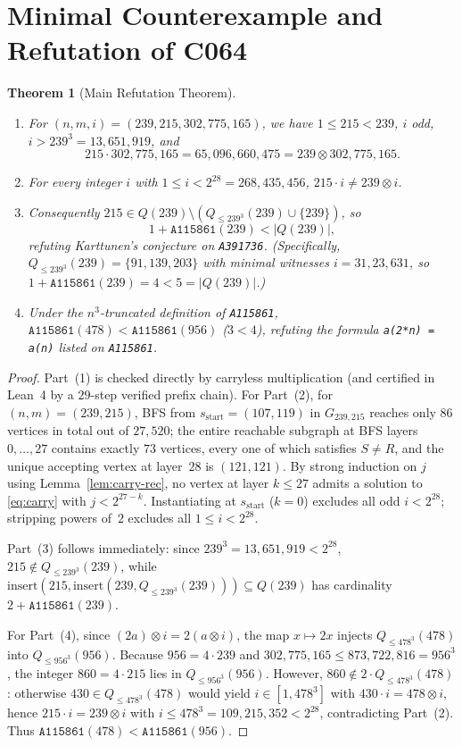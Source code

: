 \documentclass[11pt]{article}
\newtheorem{theorem}{Theorem}[section]
\theoremstyle{definition}
\newcommand{\seq}[1]{\texttt{#1}}
\newcommand{\clmul}{\otimes}
\begin{document}
\section{Minimal Counterexample and Refutation of C064}

\begin{theorem}[Main Refutation Theorem]
\label{thm:main}
\leavevmode
\begin{enumerate}
\item For $(n, m, i) = (239, 215, 302{,}775{,}165)$, we have $1 \le 215 < 239$, $i$ odd, $i > 239^3 = 13{,}651{,}919$, and
\[
215 \cdot 302{,}775{,}165 = 65{,}096{,}660{,}475 = 239 \clmul 302{,}775{,}165.
\]
\item For every integer $i$ with $1 \le i < 2^{28} = 268{,}435{,}456$, $215 \cdot i \neq 239 \clmul i$.
\item Consequently $215 \in Q(239) \setminus (Q_{\le 239^3}(239) \cup \{239\})$, so
\[
1 + \seq{A115861}(239) < |Q(239)|,
\]
refuting Karttunen's conjecture on \seq{A391736}. (Specifically, $Q_{\le 239^3}(239) = \{91, 139, 203\}$ with minimal witnesses $i = 31, 23, 631$, so $1 + \seq{A115861}(239) = 4 < 5 = |Q(239)|$.)
\item Under the $n^3$-truncated definition of \seq{A115861}, $\seq{A115861}(478) < \seq{A115861}(956)$ ($3 < 4$), refuting the formula \texttt{a(2*n) = a(n)} listed on \seq{A115861}.
\end{enumerate}
\end{theorem}

\begin{proof}
Part~(1) is checked directly by carryless multiplication (and certified in Lean~4 by a $29$-step verified prefix chain). For Part~(2), for $(n, m) = (239, 215)$, BFS from $s_{\mathrm{start}} = (107, 119)$ in $G_{239, 215}$ reaches only $86$ vertices in total out of $27{,}520$; the entire reachable subgraph at BFS layers $0, \dots, 27$ contains exactly $73$ vertices, every one of which satisfies $S \neq R$, and the unique accepting vertex at layer~$28$ is $(121, 121)$. By strong induction on $j$ using Lemma~\ref{lem:carry-rec}, no vertex at layer $k \le 27$ admits a solution to \eqref{eq:carry} with $j < 2^{27 - k}$. Instantiating at $s_{\mathrm{start}}$ ($k = 0$) excludes all odd $i < 2^{28}$; stripping powers of~$2$ excludes all $1 \le i < 2^{28}$.

Part~(3) follows immediately: since $239^3 = 13{,}651{,}919 < 2^{28}$, $215 \notin Q_{\le 239^3}(239)$, while $\mathrm{insert}(215, \mathrm{insert}(239, Q_{\le 239^3}(239))) \subseteq Q(239)$ has cardinality $2 + \seq{A115861}(239)$.

For Part~(4), since $(2a) \clmul i = 2(a \clmul i)$, the map $x \mapsto 2x$ injects $Q_{\le 478^3}(478)$ into $Q_{\le 956^3}(956)$. Because $956 = 4 \cdot 239$ and $302{,}775{,}165 \le 873{,}722{,}816 = 956^3$, the integer $860 = 4 \cdot 215$ lies in $Q_{\le 956^3}(956)$. However, $860 \notin 2 \cdot Q_{\le 478^3}(478)$: otherwise $430 \in Q_{\le 478^3}(478)$ would yield $i \in [1, 478^3]$ with $430 \cdot i = 478 \clmul i$, hence $215 \cdot i = 239 \clmul i$ with $i \le 478^3 = 109{,}215{,}352 < 2^{28}$, contradicting Part~(2). Thus $\seq{A115861}(478) < \seq{A115861}(956)$.
\end{proof}
\end{document}
